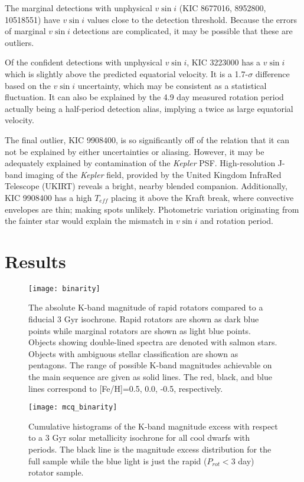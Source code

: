 \documentclass[manuscript]{aastex6}
\newcommand{\vsini}{\ensuremath{v \sin i}}
\newcommand{\Kepler}{\mbox{\textit{Kepler}}}
\newcommand{\Teff}{\ensuremath{T_{eff}}}
\begin{document}
The marginal detections with unphysical \vsini{} (KIC 8677016, 8952800, 10518551) 
have \vsini{} values close to the detection threshold. Because the errors of 
marginal \vsini{} detections are complicated, it may be possible that these 
are outliers. 

Of the confident detections with unphysical \vsini{}, KIC 3223000 has a
\vsini{} which is slightly above the predicted equatorial velocity. It
is a 1.7-\(\sigma\) difference based on the \vsini{} uncertainty, which
may be consistent as a statistical fluctuation. It can also
be explained by the 4.9 day measured rotation period actually being a 
half-period detection alias, implying a twice as large equatorial velocity. 

The final outlier, KIC 9908400, is so significantly off of the relation
that it can not be explained by either uncertainties or aliasing. However,
it may be adequately explained by contamination of the \Kepler{} PSF\@. 
High-resolution J-band imaging of the \Kepler{} field, provided by the United
Kingdom InfraRed Telescope (UKIRT) reveals a bright, nearby blended companion.
Additionally, KIC 9908400 has a high \Teff{} placing it above the Kraft
break, where convective envelopes are thin;
making spots unlikely. Photometric variation originating from the fainter 
star would explain the mismatch in \vsini{} and rotation period.

\section{Results}
\label{sec:results}

\begin{figure}[htb]
  \centering
  \texttt{[image: binarity]}
  \caption{The absolute K-band magnitude of rapid rotators compared to a 
  fiducial 3 Gyr isochrone. Rapid rotators are shown as dark blue points
while marginal rotators are shown as light blue points. Objects showing
double-lined spectra are denoted with salmon stars. Objects with
ambiguous stellar classification are shown as pentagons. The range of
possible K-band magnitudes achievable on the main sequence are given as
solid lines. The red, black, and blue lines correspond to [Fe/H]=0.5,
0.0, -0.5, respectively.}
  \label{fig:binarity}
\end{figure}

\begin{figure}[htb]
  \centering
  \texttt{[image: mcq\_binarity]}
  \caption{Cumulative histograms of the K-band magnitude excess with respect to
      a 3 Gyr solar metallicity isochrone for all cool dwarfs with 
      \citet{McQuillan14} periods. The black line is the magnitude excess
      distribution for the full sample while the blue light is just the rapid
  (\(P_{rot} < 3\) day) rotator sample.\label{fig:mcqbinarity}}
\end{figure}
\end{document}
